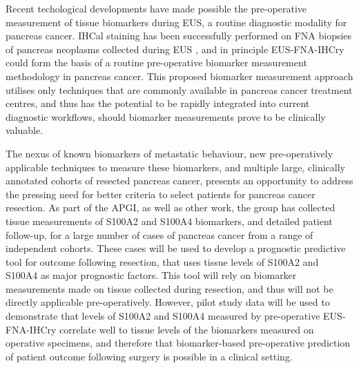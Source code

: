 \documentclass[dissertation.tex]{subfiles}
\begin{document}
Recent techological developments have made possible the pre-operative measurement of tissue biomarkers during \gls{EUS}, a routine diagnostic modality for pancreas cancer.  \Gls{IHCal} staining has been successfully performed on \gls{FNA} biopsies of pancreas neoplasms collected during \gls{EUS} \cite{Popescu2012, Salla2009, Stelow2005}, and in principle \gls{EUS}-\gls{FNA}-\acrshort{IHCry} could form the basis of a routine pre-operative biomarker measurement methodology in pancreas cancer.  This proposed biomarker measurement approach utilises only techniques that are commonly available in pancreas cancer treatment centres, and thus has the potential to be rapidly integrated into current diagnostic workflows, should biomarker measurements prove to be clinically valuable.

The nexus of known biomarkers of metastatic behaviour, new pre-operatively applicable techniques to measure these biomarkers, and multiple large, clinically annotated cohorts of resected pancreas cancer, presents an opportunity to address the pressing need for better criteria to select patients for pancreas cancer resection.  As part of the \gls{APGI}, as well as other work, the group has collected tissue measurements of S100A2 and S100A4 biomarkers, and detailed patient follow-up, for a large number of cases of pancreas cancer from a range of independent cohorts.  These cases will be used to develop a prognostic predictive tool for outcome following resection, that uses tissue levels of S100A2 and S100A4 as major prognostic factors.  This tool will rely on biomarker measurements made on tissue collected during resection, and thus will not be directly applicable pre-operatively.  However, pilot study data will be used to demonstrate that levels of S100A2 and S100A4 measured by pre-operative \gls{EUS}-\gls{FNA}-\acrshort{IHCry} correlate well to tissue levels of the biomarkers measured on operative specimens, and therefore that biomarker-based pre-operative prediction of patient outcome following surgery is possible in a clinical setting.
\end{document}
